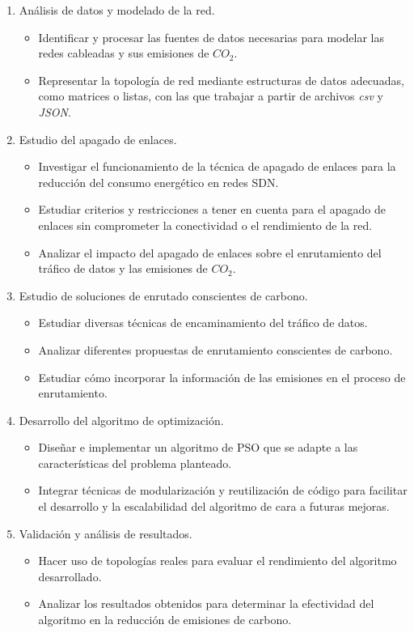 \begin{enumerate}
    \item Análisis de datos y modelado de la red.
    \begin{itemize}
        \item Identificar y procesar las fuentes de datos necesarias para modelar las redes cableadas y sus emisiones de $CO_2$.
        \item Representar la topología de red mediante estructuras de datos adecuadas, como matrices o listas, con las que trabajar a partir de archivos \textit{csv} y \textit{JSON}.
    \end{itemize}
    \item Estudio del apagado de enlaces.
    \begin{itemize}
        \item Investigar el funcionamiento de la técnica de apagado de enlaces para la reducción del consumo energético en redes SDN.
        \item Estudiar criterios y restricciones a tener en cuenta para el apagado de enlaces sin comprometer la conectividad o el rendimiento de la red.
        \item Analizar el impacto del apagado de enlaces sobre el enrutamiento del tráfico de datos y las emisiones de $CO_2$.
    \end{itemize}
    \item Estudio de soluciones de enrutado conscientes de carbono.
    \begin{itemize}
        \item Estudiar diversas técnicas de encaminamiento del tráfico de datos.
        \item Analizar diferentes propuestas de enrutamiento conscientes de carbono.
        \item Estudiar cómo incorporar la información de las emisiones en el proceso de enrutamiento.
    \end{itemize}
    \item Desarrollo del algoritmo de optimización.
    \begin{itemize}
        \item Diseñar e implementar un algoritmo de PSO que se adapte a las características del problema planteado.
        \item Integrar técnicas de modularización y reutilización de código para facilitar el desarrollo y la escalabilidad del algoritmo de cara a futuras mejoras.
    \end{itemize}
    \item Validación y análisis de resultados.
    \begin{itemize}
        \item Hacer uso de topologías reales para evaluar el rendimiento del algoritmo desarrollado.
        \item Analizar los resultados obtenidos para determinar la efectividad del algoritmo en la reducción de emisiones de carbono.
    \end{itemize}
\end{enumerate}

